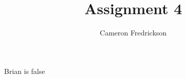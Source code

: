 \documentclass[11pt]{article}
\title{Assignment 4}
\author{Cameron Fredrickson}
\date{}
\begin{document}
\maketitle

\begin{proofbyc}
Brian is false
\end{proofbyc}
\end{document}
